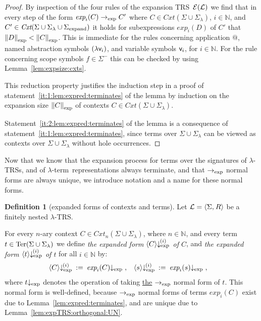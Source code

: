 \documentclass[
submission
]{dmtcs-episciences-tampered}
\makeatletter
\newcommand{\fap}[2]{#1({#2})}
\newcommand{\indap}[2]{#1 _{#2}}
\newcommand{\subap}[2]{#1 _{#2}}
\newcommand{\supap}[2]{#1 ^{#2}}
\newcommand{\bap}{\subap}
\newcommand{\bpap}[3]{#1 _{#2}^{#3}}
\newcommand{\nb}{\nobreakdash}
\newcommand{\nf}{\normalfont}
\newcommand{\sdefdby}{{:=}}
\newcommand{\defdby}{\mathrel{\sdefdby}}
\newcommand{\punc}[1]{\ensuremath{\hspace*{3pt}{#1}}}
\newcommand{\tuple}[1]{\langle #1 \rangle}
\newcommand{\tuplespace}{\hspace*{0.5pt}}
\newcommand{\pair}[2]{\tuple{#1, \tuplespace #2}}
\newcommand{\nat}{\mathbb{N}}
\newcommand{\ater}{s}
\newcommand{\bter}{t}
\newcommand{\asig}{\Sigma}
\newcommand{\asigmin}{\supap{\asig}{-}}
\newcommand{\asiglambda}{\indap{\asig}{\lambda}}
\newcommand{\asigexpand}{\indap{\asig}{\scriptexpand}}
\newcommand{\arules}{R}
\newcommand{\alTRS}{{\cal L}}
\newcommand{\TRS}{TRS}
\newcommand{\stermsover}{\text{\nf Ter}}
\newcommand{\termsover}{\fap{\stermsover}}
\newcommand{\scontextsover}{\textit{Cxt}}
\newcommand{\contextsover}{\fap{\scontextsover}}
\newcommand{\scontextsnover}{\bap{\scontextsover}}
\newcommand{\contextsnover}[1]{\fap{\scontextsnover{#1}}}
\newcommand{\sfolapp}{@}
\newcommand{\sfolabs}[1]{(\lambda{#1})}
\newcommand{\afovar}{\mathsf{v}}
\newcommand{\afovari}[1]{\indap{\afovar}{\hspace*{-0.25pt}#1}}
\newcommand{\afoscopesym}{f}
\newcommand{\acxt}{C}
\newcommand{\bcxt}{D}
\newcommand{\nary}[1]{{$#1$}\nb-ary}
\newcommand{\expsize}[1]{\left\lVert{#1}\right\rVert\bap{}{\scriptexp}}
\newcommand{\sexpandTRS}{{\cal E}}
\newcommand{\expandTRSwrt}{\fap{\sexpandTRS}}
\newcommand{\sred}{\to}
\newcommand{\sredi}{\indap{\sred}}
\newcommand{\redi}[1]{\mathrel{\sredi{#1}}}
\newcommand{\scriptexpand}{\text{\nf expand}}
\newcommand{\scriptexp}{\text{\nf exp}}
\newcommand{\sexpand}{\textit{exp}}
\newcommand{\sexpandi}{\indap{\sexpand}}
\newcommand{\expandi}[1]{\fap{\sexpandi{#1}}}
\newcommand{\sexpred}{\sredi{\scriptexp}}
\newcommand{\expred}{\redi{\scriptexp}}
\newcommand{\sexprednf}{{\downarrow_{\scriptexp}}}
\newcommand{\exprednf}[1]{{#1}\sexprednf}
\newcommand{\sexprednfi}[1]{{\bpap{\downarrow}{\scriptexp}{\hspace*{-1pt}(#1)}}}
\newcommand{\exprednfi}[2]{{\langle#2\rangle}\sexprednfi{#1}}
\newcommand{\lambdaterm}{$\lambda$\nb-term}
\newcommand{\lTRS}{$\lambda$\hspace*{-0.5pt}\nb-\hspace*{-0.5pt}\TRS}
\newcommand{\lTRSs}{\lTRS{s}}
\newcommand{\welldefined}{well-de\-fined}
\theoremstyle{plain}
\theoremstyle{definition}
\newtheorem{definition}[theorem]{Definition}
\makeatother
\begin{document}
\begin{proof}By inspection of the four rules of the expansion TRS~$\expandTRSwrt{\alTRS}$
  we find that in every step of the form 
  $\expandi{i}{\acxt} \expred \acxt'$ where $\acxt\in\contextsover{\asig\cup\asiglambda}$, $i\in\nat$,
                                            and $\acxt'\in\contextsover{\asig\cup\asiglambda\cup\asigexpand}$
  it holds for subexpressions $\expandi{i}{\bcxt}$ of $\acxt'$ 
  that $\expsize{\bcxt} < \expsize{\acxt}$. 
  This is immediate for the rules concerning application $\sfolapp$, named abstraction symbols $\sfolabs{\afovari{i}}$, and variable symbols $\afovari{i}$,
  for $i\in\nat$.  
  For the rule concerning scope symbols $\afoscopesym\in\asigmin$ 
  this can be checked by using Lemma~\ref{lem:expsize:cxts}.
  
  This reduction property justifies the induction step in a proof of statement~\eqref{it:1:lem:expred:terminates} of the lemma
  by induction on the expansion size $\expsize{\acxt}$ of contexts $\acxt\in\contextsover{\asig\cup\asiglambda}$.
  
  Statement~\eqref{it:2:lem:expred:terminates} of the lemma is a consequence of statement~\eqref{it:1:lem:expred:terminates},
  since terms over $\asig\cup\asiglambda$ can be viewed as contexts over $\asig\cup\asiglambda$ without hole occurrences. 
\end{proof}



Now that we know that the expansion process for terms over the signatures of \lTRSs, and of \lambdaterm\ representations
always terminate, and that $\sexpred$ normal forms are always unique, we introduce notation and a name for these normal forms.


\begin{definition}[expanded forms of contexts and terms]\label{def:expanded:form:cxts:terms}
  Let $\alTRS = \pair{\asig}{\arules}$ be a finitely nested \lTRS. 
  
  For every \nary{n} context $\acxt\in\contextsnover{n}{\asig\cup\asiglambda}$, where $n\in\nat$, and every term $\bter\in\termsover{\asig\cup\asiglambda}$ 
  we define \emph{the expanded form $\exprednfi{i}{\acxt}$ of $\acxt$}, and \emph{the expanded form $\exprednfi{i}{\bter}$ of $\bter$} 
  for all $i\in\nat$ by: 
  \begin{align*}
    \exprednfi{i}{\acxt} \: & \defdby\: \exprednf{\expandi{i}{\acxt}} \punc{,}
      &
    \exprednfi{i}{\ater} & \:\defdby\: \exprednf{\expandi{i}{\ater}} \punc{,}
  \end{align*}
  where $\exprednf{\bter}$ denotes the operation of taking \underline{the} $\expred$ normal form of $\bter$.
  This normal form is \welldefined, because $\sexpred$ normal forms of terms $\expandi{i}{\acxt}$ exist due to Lemma~\ref{lem:expred:terminates},
  and are unique due to Lemma~\ref{lem:expTRS:orthogonal:UN}.
\end{definition}
\end{document}
